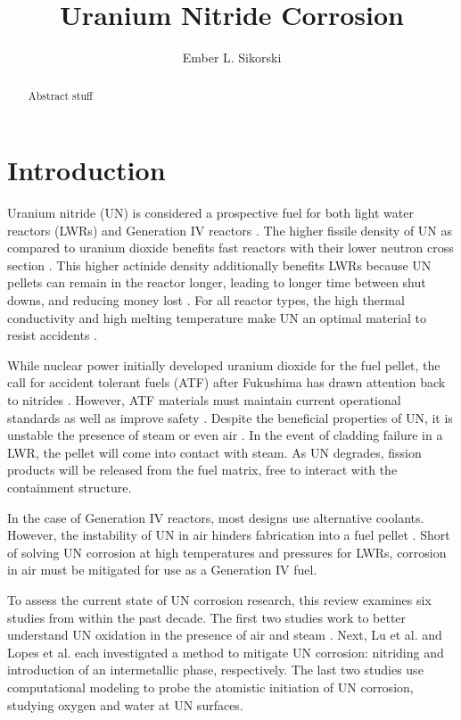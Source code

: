 \documentclass[3p,review,11pt]{elsarticle}
\begin{document}
\begin{frontmatter}
	\title{Uranium Nitride Corrosion}
	
	\author[boise]{Ember L. Sikorski}
	
	
	\address[boise]{Boise State University}
	
	\begin{abstract}
Abstract stuff
	\end{abstract}	
	
\end{frontmatter}


\section{Introduction}

Uranium nitride (UN) is considered a prospective fuel for both light water reactors (LWRs) and Generation IV reactors \cite{Streit2005,Mizutani1998}. The higher fissile density of UN as compared to uranium dioxide benefits fast reactors with their lower neutron cross section \cite{Silva2009}. This higher actinide density additionally benefits LWRs because UN pellets can remain in the reactor longer, leading to longer time between shut downs, and reducing money lost \cite{Lopes2017}. For all reactor types, the high thermal conductivity and high melting temperature make UN an optimal material to resist accidents \cite{Lopes2017}.
\par 
While nuclear power initially developed uranium dioxide for the fuel pellet, the call for accident tolerant fuels (ATF) after Fukushima has drawn attention back to nitrides \cite{Johnson2016}. However, ATF materials must maintain current operational standards as well as improve safety \cite{Zinkle2014}. Despite the beneficial properties of UN, it is unstable the presence of steam or even air \cite{Johnson2016,Jolkkonen2017,Lopes2017}. In the event of cladding failure in a LWR, the pellet will come into contact with steam. As UN degrades, fission products will be released from the fuel matrix, free to interact with the containment structure.
\par 
 In the case of Generation IV reactors, most designs use alternative coolants. However, the instability of UN in air hinders fabrication into a fuel pellet \cite{Lopes2017}. Short of solving UN corrosion at high temperatures and pressures for LWRs, corrosion in air must be mitigated for use as a Generation IV fuel.
 \par 
 To assess the current state of UN corrosion research, this review examines six studies from within the past decade. The first two studies work to better understand UN oxidation in the presence of air \cite{Johnson2016} and steam \cite{Jolkkonen2017}. Next, Lu et al. \cite{Lu2016} and Lopes et al. \cite{Lopes2017} each investigated a method to mitigate UN corrosion: nitriding and introduction of an intermetallic phase, respectively. The last two studies use computational modeling to probe the atomistic initiation of UN corrosion, studying oxygen \cite{Bocharov2013} and water \cite{Bo2016} at UN surfaces.
\end{document}
